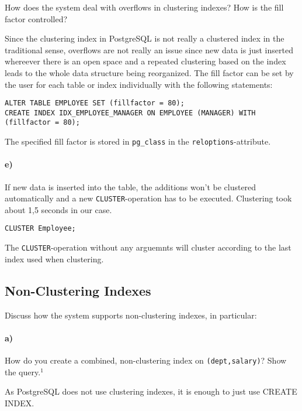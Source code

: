 \documentclass[11pt]{scrartcl}
\begin{document}
How does the system deal with overflows in clustering indexes? How is the fill factor controlled?

Since the clustering index in PostgreSQL is not really a clustered index in the traditional sense, overflows are not really an issue since new data is just inserted whereever there is an open space and a repeated clustering based on the index leads to the whole data structure being reorganized.
The fill factor can be set by the user for each table or index individually with the following statements:

\begin{lstlisting}[style=dbtsql]
ALTER TABLE EMPLOYEE SET (fillfactor = 80);
CREATE INDEX IDX_EMPLOYEE_MANAGER ON EMPLOYEE (MANAGER) WITH (fillfactor = 80);
\end{lstlisting}

The specified fill factor is stored in \texttt{pg\_class} in the \texttt{reloptions}-attribute.

\paragraph{e)}

If new data is inserted into the table, the additions won't be clustered automatically and a new \texttt{CLUSTER}-operation has to be executed. Clustering took about 1,5 seconds in our case.

\begin{lstlisting}[style=dbtsql]
CLUSTER Employee;
\end{lstlisting}

The \texttt{CLUSTER}-operation without any arguemnts will cluster according to the last index used when clustering.

\subsection{Non-Clustering Indexes}

Discuss how the system supports non-clustering indexes, in particular:

\paragraph{a)}

How do you create a combined, non-clustering index on \texttt{(dept,salary)}? Show the query.$^1$

As PostgreSQL does not use clustering indexes, it is enough to just use
CREATE INDEX.
\end{document}

